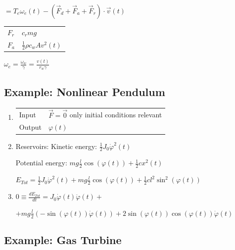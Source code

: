 \documentclass[10pt,a4paper]{scrartcl}
\begin{document}
\begin{multicols*}{3}
\begin{enumerate}
$=T_e\omega_e(t)-\left(\vec{F}_d+\vec{F}_a+\vec{F}_r\right)\cdot \vec{v}(t)$

\begin{tabular}{l@{ = }l}
$F_r$&$c_rmg$\\
$F_a$&$\frac{1}{2}\rho c_w A v^2(t)$
\end{tabular}\hfill $\omega_e=\frac{\omega_w}{\gamma}=\frac{v(t)}{r_w\gamma}$


\end{enumerate}



\subsection{Example: Nonlinear Pendulum}


\begin{enumerate}
\item \begin{tabular}{ll}Input & $\vec{F}=\vec{0}$ only initial conditions relevant\\Output & $\varphi(t)$ \end{tabular}
\item Reservoirs: Kinetic energy: $\frac{1}{2}J_0\dot{\varphi}^2(t)$

Potential energy: $mg\frac{l}{2}\cos(\varphi(t))+\frac{1}{2}cx^2(t)$

$E_{Tot}=\frac{1}{2}J_0\dot{\varphi}^2(t)+mg\frac{l}{2}\cos(\varphi(t))+\frac{1}{2}cl^2\sin^2(\varphi(t))$

\item $0\equiv\frac{dE_{Tot}}{dt}=J_0\dot{\varphi}(t)\ddot{\varphi}(t)+$ 

$+mg\frac{l}{2}\left(-\sin(\varphi(t))\dot{\varphi}(t)\right)+2\sin(\varphi(t))\cos(\varphi(t))\dot{\varphi}(t)$


\end{enumerate}


\subsection{Example: Gas Turbine}\label{GasTurbine}


\end{multicols*}
\end{document}
